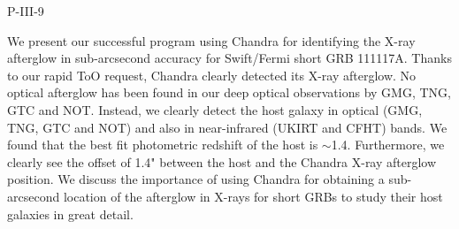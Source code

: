 P-III-9


\bigskip



\bigskip

\noindent We present our successful program using Chandra for identifying the X-ray afterglow in sub-arcsecond accuracy for Swift/Fermi short GRB 111117A. Thanks to our rapid ToO request, Chandra clearly detected its X-ray afterglow.  No optical afterglow has been found in our deep optical observations by GMG, TNG, GTC and NOT.  Instead, we clearly detect the host galaxy in optical (GMG, TNG, GTC and NOT) and also in near-infrared (UKIRT and CFHT) bands.  We found that the best fit photometric redshift of the host is $\sim$1.4. Furthermore, we clearly see the offset of 1.4" between the host and the Chandra X-ray afterglow position.  We discuss the importance of using Chandra for obtaining a sub-arcsecond location of the afterglow in X-rays for short GRBs to study their host galaxies in great detail.

